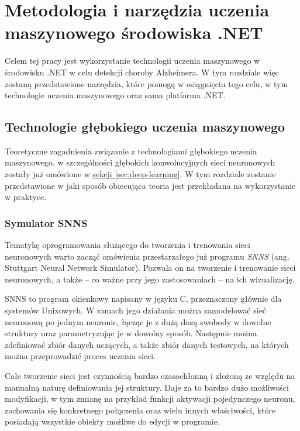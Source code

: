 \chapter{Metodologia i narzędzia uczenia maszynowego środowiska .NET}

Celem tej pracy jest wykorzystanie technologii uczenia maszynowego w środowisku .NET w celu detekcji choroby Alzheimera.
W tym rozdziale więc zostaną przedstawione narzędzia, które pomogą w osiągnięciu tego celu, w tym technologie uczenia maszynowego oraz sama platforma .NET.

\section{Technologie głębokiego uczenia maszynowego}

Teoretyczne zagadnienia związanie z technologiami głębokiego uczenia maszynowego, w szczególności głębokich konwolucyjnych sieci neuronowych zostały już omówione w \hyperref[sec:deep-learning]{sekcji \ref*{sec:deep-learning}}.
W tym rozdziale zostanie przedstawione w jaki sposób obiecująca teoria jest przekładana na wykorzystanie w praktyce.

\subsection{Symulator SNNS}

Tematykę oprogramowania służącego do tworzenia i trenowania sieci neuronowych warto zacząć omówienia przestarzałego już programu \emph{SNNS} (ang. Stuttgart Neural Network Simulator).
Pozwala on na tworzenie i trenowanie sieci neuronowych, a także -- co ważne przy jego zastosowaniach -- na ich wizualizację.

SNNS to program okienkowy napisany w języku C, przeznaczony głównie dla systemów Unixowych.
W ramach jego działania można zamodelować sieć neuronową po jednym neuronie, łącząc je z dużą dozą swobody w dowolne struktury oraz parametryzując je w dowolny sposób.
Następnie można zdefiniować zbiór danych uczących, a także zbiór danych testowych, na których można przeprowadzić proces uczenia sieci.

Całe tworzenie sieci jest czynnością bardzo czasochłonną i złożoną ze względu na manualną naturę definiowania jej struktury.
Daje za to bardzo dużo możliwości modyfikacji, w tym zmianę na przykład funkcji aktywacji pojedynczego neuronu, zachowania się konkretnego połączenia oraz wielu innych właściwości, które posiadają wszystkie obiekty możliwe do edycji w programie.

